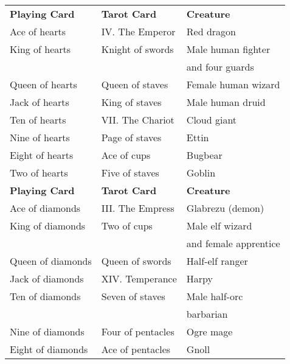 \begin{tabularx}{\linewidth}{lll}
\textbf{Playing Card}  & \textbf{Tarot Card}    & \textbf{Creature}                       \\
Ace of hearts          & IV. The Emperor        & Red dragon                              \\
King of hearts         & Knight of swords       & Male human fighter \\
                       &                        & and four guards      \\
Queen of hearts        & Queen of staves        & Female human wizard                     \\
Jack of hearts         & King of staves         & Male human druid                        \\
Ten of hearts          & VII. The Chariot       & Cloud giant                             \\
Nine of hearts         & Page of staves         & Ettin                                   \\
Eight of hearts        & Ace of cups            & Bugbear                                 \\
Two of hearts          & Five of staves         & Goblin                                  \\
\textbf{Playing Card}  & \textbf{Tarot Card}    & \textbf{Creature}                       \\
Ace of diamonds        & III. The Empress       & Glabrezu (demon)                        \\
King of diamonds       & Two of cups            & Male elf wizard \\
                       &                        & and female apprentice   \\
Queen of diamonds      & Queen of swords        & Half-elf ranger                         \\
Jack of diamonds       & XIV. Temperance        & Harpy                                   \\
Ten of diamonds        & Seven of staves        & Male half-orc \\
                       &                        & barbarian                 \\
Nine of diamonds       & Four of pentacles      & Ogre mage                               \\
Eight of diamonds      & Ace of pentacles       & Gnoll                                   \\

\end{tabularx}
